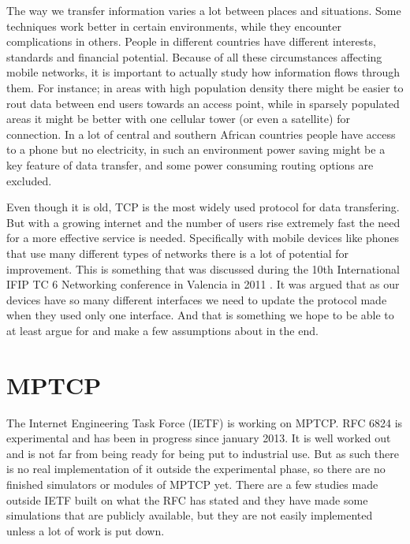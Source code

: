 \documentclass[11pt,twocolumn]{article}
\begin{document}
The way we transfer information varies a lot between places and situations. Some techniques work better in certain environments, while they encounter complications in others. People in different countries have different interests, standards and financial potential. Because of all these circumstances affecting mobile networks, it is important to actually study how information flows through them. For instance; in areas with high population density there might be easier to rout data between end users towards an access point, while in sparsely populated areas it might be better with one cellular tower (or even a satellite) for connection. In a lot of central and southern African countries people have access to a phone but no electricity, in such an environment power saving might be a key feature of data transfer, and some power consuming routing options are excluded.

Even though it is old, TCP is the most widely used protocol for data transfering. But with a growing internet and the number of users rise extremely fast the need for a more effective service is needed. Specifically with mobile devices like phones that use many different types of networks there is a lot of potential for improvement. This is something that was discussed during the 10th International IFIP TC 6 Networking conference in Valencia in 2011 \cite{RFC6824}. It was argued that as our devices have so many different interfaces we need to update the protocol made when they used only one interface. And that is something we hope to be able to at least argue for and make a few assumptions about in the end.



\section{MPTCP}
The Internet Engineering Task Force (IETF) is working on MPTCP. RFC 6824 is experimental and has been in progress since january 2013. It is well worked out and is not far from being ready for being put to industrial use. But as such there is no real implementation of it outside the experimental phase, so there are no finished simulators or modules of MPTCP yet. There are a few studies made outside IETF built on what the RFC has stated and they have made some simulations that are publicly available, but they are not easily implemented unless a lot of work is put down.
\end{document}
